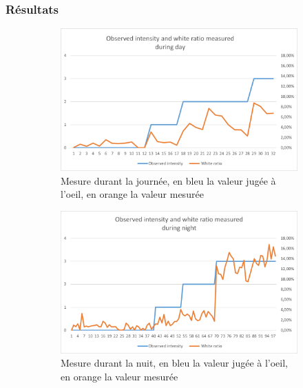 \subsubsection{Résultats}
\begin{figure}[H]
    \begin{subfigure}{.45\textwidth}
        \includegraphics[width=\linewidth]{Images/computer_vision/snowfall/dayMes.png}
        \caption{Mesure durant la journée, en bleu la valeur jugée à l'oeil, en orange la valeur mesurée}
        \label{fig:Snowfall_dayMes}
    \end{subfigure}
    \hfill
    \begin{subfigure}{.45\textwidth}
        \includegraphics[width=\linewidth]{Images/computer_vision/snowfall/nightMes.png}
        \caption{Mesure durant la nuit, en bleu la valeur jugée à l'oeil, en orange la valeur mesurée}
        \label{fig:Snowfall_nightMes}
    \end{subfigure}
    \hfill
    \begin{subfigure}{.45\textwidth}

\end{subfigure}
\end{figure}
